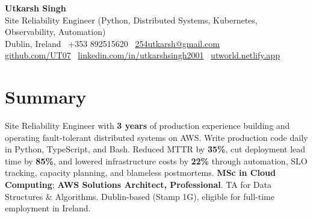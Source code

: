 \documentclass[10pt,a4paper]{article}
\begin{document}
\begin{center}
{\Large \textbf{Utkarsh Singh}}\\[0.04em]
{\normalsize Site Reliability Engineer (Python, Distributed Systems, Kubernetes, Observability, Automation)}\\[0.08em]
Dublin, Ireland \textbar\ +353 892515620 \textbar\ \href{mailto:254utkarsh@gmail.com}{254utkarsh@gmail.com}\\[0.08em]
\href{https://github.com/UT07}{github.com/UT07} \textbar\
\href{https://www.linkedin.com/in/utkarshsingh2001/}{linkedin.com/in/utkarshsingh2001} \textbar\
\href{https://utworld.netlify.app}{utworld.netlify.app}
\end{center}
\vspace{0.06em}

\section*{Summary}
Site Reliability Engineer with \textbf{3 years} of production experience building and operating fault-tolerant distributed systems on AWS. Write production code daily in Python, TypeScript, and Bash. Reduced MTTR by \textbf{35\%}, cut deployment lead time by \textbf{85\%}, and lowered infrastructure costs by \textbf{22\%} through automation, SLO tracking, capacity planning, and blameless postmortems. \textbf{MSc in Cloud Computing}; \textbf{AWS Solutions Architect, Professional}. TA for Data Structures \& Algorithms. Dublin-based (Stamp 1G), eligible for full-time employment in Ireland.

\end{document}
